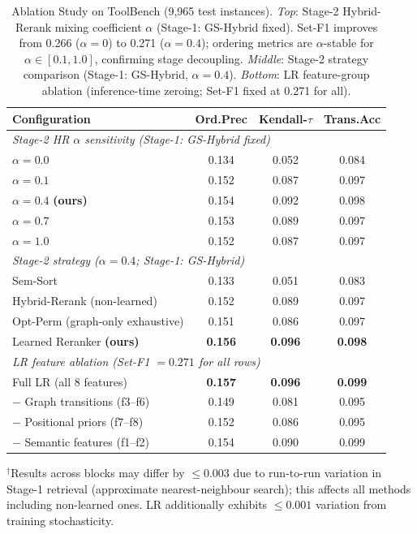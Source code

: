 \begin{table}[!t]
\caption{Ablation Study on ToolBench (9,965 test instances).
\textit{Top}: Stage-2 Hybrid-Rerank mixing coefficient $\alpha$ (Stage-1: GS-Hybrid fixed).
Set-F1 improves from 0.266 ($\alpha{=}0$) to 0.271 ($\alpha{=}0.4$); ordering metrics
are $\alpha$-stable for $\alpha \in [0.1, 1.0]$, confirming stage decoupling.
\textit{Middle}: Stage-2 strategy comparison (Stage-1: GS-Hybrid, $\alpha{=}0.4$).
\textit{Bottom}: LR feature-group ablation (inference-time zeroing; Set-F1 fixed at 0.271 for all).}
\label{tab:ablation}
\centering
\small
\setlength{\tabcolsep}{4pt}%
\begin{tabular}{l@{\hspace{5pt}}c@{\hspace{5pt}}c@{\hspace{5pt}}c}
\toprule
\textbf{Configuration} & \textbf{Ord.Prec} & \textbf{Kendall-$\tau$} & \textbf{Trans.Acc} \\
\midrule
\multicolumn{4}{l}{\textit{Stage-2 HR $\alpha$ sensitivity (Stage-1: GS-Hybrid fixed)}} \\
$\alpha = 0.0$              & 0.134 & 0.052 & 0.084 \\
$\alpha = 0.1$              & 0.152 & 0.087 & 0.097 \\
$\alpha = 0.4$ \textbf{(ours)} & 0.154 & 0.092 & 0.098 \\
$\alpha = 0.7$              & 0.153 & 0.089 & 0.097 \\
$\alpha = 1.0$              & 0.152 & 0.087 & 0.097 \\
\midrule
\multicolumn{4}{l}{\textit{Stage-2 strategy ($\alpha{=}0.4$; Stage-1: GS-Hybrid)}} \\
Sem-Sort                        & 0.133 & 0.051 & 0.083 \\
Hybrid-Rerank (non-learned)     & 0.152 & 0.089 & 0.097 \\
Opt-Perm (graph-only exhaustive) & 0.151 & 0.086 & 0.097 \\
Learned Reranker \textbf{(ours)}& \textbf{0.156} & \textbf{0.096} & \textbf{0.098} \\
\midrule
\multicolumn{4}{l}{\textit{LR feature ablation (Set-F1 $= 0.271$ for all rows)}} \\
Full LR (all 8 features)            & \textbf{0.157} & \textbf{0.096} & \textbf{0.099} \\
$-$ Graph transitions (f3--f6)      & 0.149 & 0.081 & 0.095 \\
$-$ Positional priors (f7--f8)      & 0.152 & 0.086 & 0.095 \\
$-$ Semantic features (f1--f2)      & 0.154 & 0.090 & 0.099 \\
\bottomrule
\end{tabular}
\smallskip\par\noindent\footnotesize
$^\dagger$Results across blocks may differ by ${\leq}0.003$ due to run-to-run variation in Stage-1 retrieval (approximate nearest-neighbour search); this affects all methods including non-learned ones. LR additionally exhibits ${\leq}0.001$ variation from training stochasticity.
\end{table}
